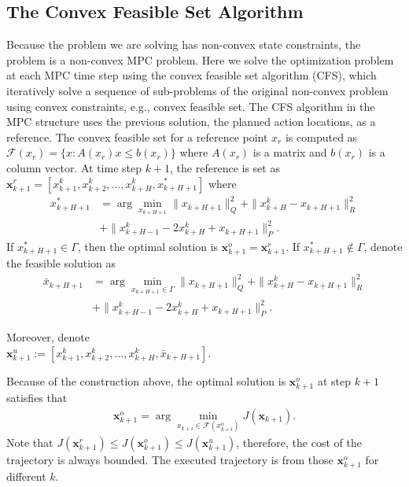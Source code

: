 \documentclass[letterpaper, 10 pt, conference]{ieeeconf}  %
\begin{document}
\subsection{The Convex Feasible Set Algorithm}
Because the problem we are solving has non-convex state constraints, the problem is a non-convex MPC problem. Here we solve the optimization problem at each MPC time step using the convex feasible set algorithm (CFS), which iteratively solve a sequence of sub-problems of the original non-convex problem using convex constraints, e.g., convex feasible set. The CFS algorithm in the MPC structure uses the previous solution, the planned action locations, as a reference. The convex feasible set for a reference point $x_r$ is computed as $\mathcal{F}(x_r) = \{x:A(x_r)x\leq b(x_r)\}$ where $A(x_r)$ is a matrix and $b(x_r)$ is a column vector. 
At time step $k+1$, the reference is set as $\mathbf{x}_{k+1}^{r}=[x_{k+1}^{k},x_{k+2}^{k},\ldots,x_{k+H}^k, x_{k+H+1}^*]$ where
\begin{equation}
\begin{split}
x_{k+H+1}^* & = \arg\min_{x_{k+H+1}} \|x_{k+H+1}\|_Q^2+\|x_{k+H}^k-x_{k+H+1}\|_R^2 \\
 & +\|x_{k+H-1}^k -2x_{k+H}^k+x_{k+H+1}\|_P^2\text{.}
\end{split}
\end{equation}
If $x_{k+H+1}^*\in\Gamma$, then the optimal solution is $\mathbf{x}_{k+1}^o = \mathbf{x}_{k+1}^r$.  If $x_{k+H+1}^*\notin\Gamma$, denote the feasible solution as 
\begin{equation}
\begin{split}
\bar{x}_{k+H+1} & = \arg\min_{x_{k+H+1}\in\Gamma} \|x_{k+H+1}\|_Q^2+\|x_{k+H}^k-x_{k+H+1}\|_R^2 \\
 & +\|x_{k+H-1}^k -2x_{k+H}^k+x_{k+H+1}\|_P^2 \text{.}
\end{split}
\end{equation}

Moreover, denote \\$\mathbf{x}_{k+1}^{u}:=[x_{k+1}^{k},x_{k+2}^{k},\ldots,x_{k+H}^k, \bar x_{k+H+1}]$. 

Because of the construction above, the optimal solution is $\mathbf{x}_{k+1}^{o}$ at step $k+1$ satisfies that
\begin{eqnarray}
\mathbf{x}_{k+1}^{o} = \arg\min_{x_{k+i}\in \mathcal{F}(x_{k+i}^o)}J(\mathbf{x}_{k+1}).
\end{eqnarray}
Note that $J(\mathbf{x}_{k+1}^{r})\leq J(\mathbf{x}_{k+1}^{o})\leq J(\mathbf{x}_{k+1}^{u})$, therefore, the cost of the trajectory is always bounded. 
The executed trajectory is from those $\mathbf{x}_{k+1}^{o}$ for different $k$.
\end{document}
